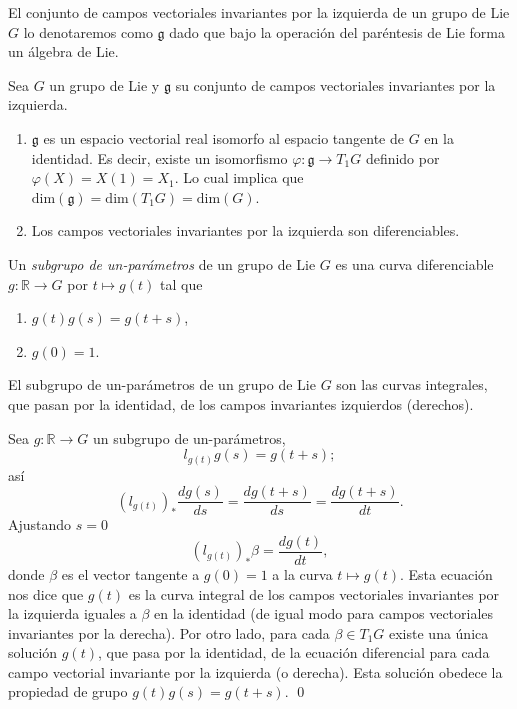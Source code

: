 \begin{pro}
\label{pro:LeftInvariantLieAlgebra}
El conjunto de campos vectoriales invariantes por la izquierda de un grupo de Lie $G$ lo denotaremos como $\mathfrak{g}$ dado que bajo la operaci\'{o}n del par\'{e}ntesis de Lie forma un \'{a}lgebra de Lie.
\end{pro}

\begin{pro}
Sea $G$ un grupo de Lie y $\mathfrak{g}$ su conjunto de campos vectoriales invariantes por la izquierda.
%
\begin{enumerate}
\item{$\mathfrak{g}$ es un espacio vectorial real isomorfo al espacio tangente de $G$ en la identidad. Es decir, existe un isomorfismo $\varphi: \mathfrak{g} \rightarrow T_{1} G$ definido por $\varphi(X) = X(1) = X_{1}$. Lo cual implica que $\mathrm{dim} (\mathfrak{g}) = \mathrm{dim} (T_{1} G) = \mathrm{dim} (G)$.}
\item{Los campos vectoriales invariantes por la izquierda son diferenciables.}
\end{enumerate}
%
\end{pro}

\begin{mydef}
Un \emph{subgrupo de un-par\'{a}metros} de un grupo de Lie $G$ es una curva diferenciable $g: \mathbb{R} \rightarrow G$ por $t \mapsto g (t)$ tal que
%
\begin{enumerate}
\item{$g (t) g (s) = g (t + s)$,}
\item{$g (0) = 1$.}
\end{enumerate}
%
\end{mydef}

\begin{thm}
El subgrupo de un-par\'{a}metros de un grupo de Lie $G$ son las curvas integrales, que pasan por la identidad, de los campos invariantes izquierdos (derechos).
\end{thm}

\begin{dem}
Sea $g: \mathbb{R} \rightarrow G$ un subgrupo de un-par\'{a}metros, $$l_{g(t)} g(s) = g(t + s);$$ as\'{i} $$(l_{g(t)})_{*} \frac{d g(s)}{d s} = \frac{d g(t +s )}{d s} = \frac{d g(t + s)}{d t}.$$ Ajustando $s = 0$ $$(l_{g(t)})_{*} \beta = \frac{d g(t)}{d t},$$ donde $\beta$ es el vector tangente a $g (0) = 1$ a la curva $t \mapsto g (t)$. Esta ecuaci\'{o}n nos dice que $g (t)$ es la curva integral de los campos vectoriales invariantes por la izquierda iguales a $\beta$ en la identidad (de igual modo para campos vectoriales invariantes por la derecha). Por otro lado, para cada $\beta \in T_{1} G$ existe una \'{u}nica soluci\'{o}n $g (t)$, que pasa por la identidad, de la ecuaci\'{o}n diferencial para cada campo vectorial invariante por la izquierda (o derecha). Esta soluci\'{o}n obedece la propiedad de grupo $g (t) g (s) = g (t + s)$. \qed
\end{dem}

